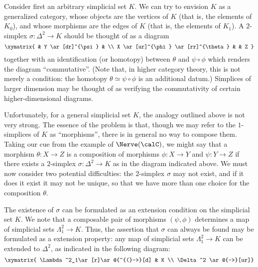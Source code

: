 Consider first an arbitrary simplicial set $K$. We can try to envision $K$ as a generalized category, whose objects are the vertices of $K$ (that is, the elements of $K_0$), and whose morphisms are the edges of $K$ (that is, the elements of $K_1$). A $2$-simplex
$\sigma: \Delta^2 \rightarrow K$ should be thought of as a diagram
$$ \xymatrix{ & Y \ar[dr]^{\psi} & \\
X \ar[ur]^{\phi} \ar[rr]^{\theta} & & Z }$$
together with an identification (or homotopy) between $\theta$ and $\psi \circ \phi$
which renders the diagram ``commutative''. (Note that, in higher category theory, 
this is not merely a condition: the homotopy $\theta \simeq \psi \circ \phi$ is an additional datum.)
Simplices of larger dimension may be thought of as verifying the
commutativity of certain higher-dimensional diagrams.

Unfortunately, for a general simplicial set $K$, the analogy
outlined above is not very strong. The essence of the problem is that, though we may refer
to the $1$-simplices of $K$ as ``morphisms'', there is in general no way to compose them.
Taking our cue from the example of $\Nerve(\calC)$,
we might say that a morphism $\theta:X \rightarrow Z$ is a composition of morphisms
$\phi: X \rightarrow Y$ and $\psi: Y \rightarrow Z$ if there exists a $2$-simplex
$\sigma: \Delta^2 \rightarrow K$ as in the diagram indicated above. 
We must now consider two potential difficulties: the $2$-simplex $\sigma$ may not exist, and
if it does it exist it may not be unique, so that we have more than one choice for the composition $\theta$.

The existence of $\sigma$ can be formulated as an extension condition on the simplicial set $K$.
We note that a composable pair of morphisms $(\psi, \phi)$ determines a map
of simplicial sets
$\Lambda^2_1 \rightarrow K$. Thus, the assertion that $\sigma$ can
always be found may be formulated as a extension property: any
map of simplicial sets $\Lambda^2_1 \rightarrow K$ can be extended to $\Delta^2$, as indicated in the following diagram:
$$ \xymatrix{ \Lambda^2_1\ar[r]\ar@{^{(}->}[d] & K \\
\Delta^2 \ar@{-->}[ur]}$$

